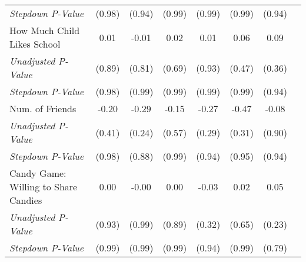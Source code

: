 \begin{tabular}{l c c c c c c c}
\quad \textit{Stepdown P-Value} & (0.98) & (0.94) & (0.99) & (0.99) & (0.99) & (0.94) \\
How Much Child Likes School & 0.01 & -0.01 & 0.02 & 0.01 & 0.06 & 0.09 \\
\quad \textit{Unadjusted P-Value} & (0.89) & (0.81) & (0.69) & (0.93) & (0.47) & (0.36) \\
\quad \textit{Stepdown P-Value} & (0.98) & (0.99) & (0.99) & (0.99) & (0.99) & (0.94) \\
Num. of Friends & -0.20 & -0.29 & -0.15 & -0.27 & -0.47 & -0.08 \\
\quad \textit{Unadjusted P-Value} & (0.41) & (0.24) & (0.57) & (0.29) & (0.31) & (0.90) \\
\quad \textit{Stepdown P-Value} & (0.98) & (0.88) & (0.99) & (0.94) & (0.95) & (0.94) \\
Candy Game: Willing to Share Candies & 0.00 & -0.00 & 0.00 & -0.03 & 0.02 & 0.05 \\
\quad \textit{Unadjusted P-Value} & (0.93) & (0.99) & (0.89) & (0.32) & (0.65) & (0.23) \\
\quad \textit{Stepdown P-Value} & (0.99) & (0.99) & (0.99) & (0.94) & (0.99) & (0.79) \\
\bottomrule
\end{tabular}
